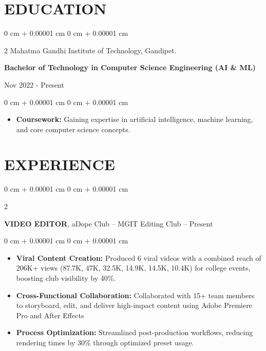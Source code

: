\documentclass[10pt, letterpaper]{article}
\newenvironment{highlights}{
    \begin{itemize}[
        topsep=0.10 cm,
        parsep=0.10 cm,
        partopsep=0pt,
        itemsep=0pt,
        leftmargin=0 cm + 10pt
    ]
}{
    \end{itemize}
} %
\newenvironment{onecolentry}{
    \begin{adjustwidth}{
        0 cm + 0.00001 cm
    }{
        0 cm + 0.00001 cm
    }
}{
    \end{adjustwidth}
} %
\newenvironment{twocolentry}[2][]{
    \onecolentry
    \def\secondColumn{#2}
    \setcolumnwidth{\fill, 4.5 cm}
    \begin{paracol}{2}
}{
    \switchcolumn \raggedleft \secondColumn
    \end{paracol}
    \endonecolentry
} %
\begin{document}
    \section{EDUCATION}



        
        \begin{twocolentry}{
            Nov 2022 - Present } Mahatma Gandhi Institute of Technology, Gandipet. 

            
            {\textbf{Bachelor of Technology in Computer Science Engineering (AI \& ML)}}
            \end{twocolentry}
            
        


        \vspace{0.10 cm}
        \begin{onecolentry}
            \begin{highlights}
                \item \textbf{Coursework:} Gaining expertise in artificial intelligence, machine learning, and core computer science concepts.
            \end{highlights}
        \end{onecolentry}



    
    \section{EXPERIENCE}



        
        \begin{twocolentry}{
             2024 – Present
        }
            \textbf{VIDEO EDITOR}, aDope Club -- MGIT Editing Club\end{twocolentry}

        \vspace{0.10 cm}
        \begin{onecolentry}
            \begin{highlights}
                \item \textbf{Viral Content Creation:}  
Produced 6 viral videos with a combined reach of 206K+ views (87.7K, 47K, 32.5K, 14.9K, 14.5K, 10.4K) for college events, boosting club visibility by 40\%.
                \item \textbf{Cross-Functional Collaboration:} Collaborated with 15+ team members to storyboard, edit, and deliver high-impact content using Adobe Premiere Pro and After Effects 
                \item \textbf{Process Optimization:} 
Streamlined post-production workflows, reducing rendering times by 30\% through optimized preset usage.

 
            \end{highlights}
        \end{onecolentry}
\end{document}
